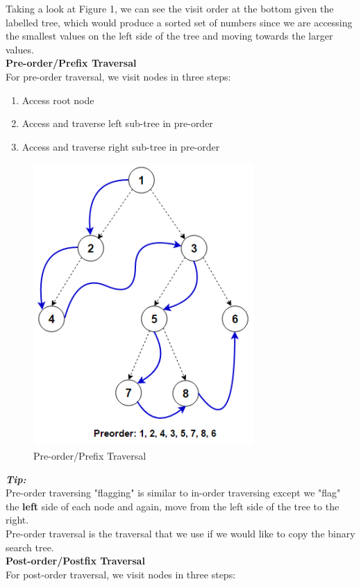\documentclass[hidelinks,11pt]{article}
\begin{document}
Taking a look at Figure 1, we can see the visit order at the bottom given the labelled tree, which would produce a sorted set of numbers since we are accessing the smallest values on the left side of the tree and moving towards the larger values. \\[0.5\baselineskip] 
\textbf{Pre-order/Prefix Traversal}\\
For pre-order traversal, we visit nodes in three steps:
\begin{enumerate}
    \item Access root node
    \item Access and traverse left sub-tree in pre-order
    \item Access and traverse right sub-tree in pre-order
\end{enumerate}
\begin{figure}[h!]
    \centering
    \includegraphics[scale=0.8]{prefix.png}
    \caption{Pre-order/Prefix Traversal}
\end{figure}
\textit{\textbf{Tip:}}\\
Pre-order traversing "flagging" is similar to in-order traversing except we "flag" the \textbf{left} side of each node and again, move from the left side of the tree to the right. \\[0.5\baselineskip]
Pre-order traversal is the traversal that we use if we would like to copy the binary search tree. \\[0.5\baselineskip]
\textbf{Post-order/Postfix Traversal}\\
For post-order traversal, we visit nodes in three steps:
\end{document}
